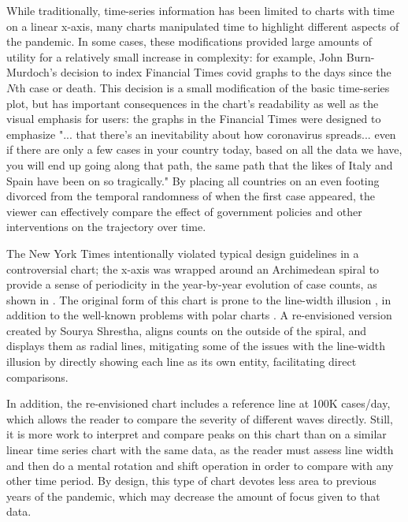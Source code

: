 \documentclass[article]{jdssv}\usepackage[]{graphicx}\usepackage[]{xcolor}
\begin{document}
While traditionally, time-series information has been limited to charts with time on a linear x-axis, many charts manipulated time to highlight different aspects of the pandemic. In some cases, these modifications provided large amounts of utility for a relatively small increase in complexity: for example, John Burn-Murdoch's decision to index Financial Times covid graphs to the days since the $N$th case or death. This decision is a small modification of the basic time-series plot, but has important consequences in the chart's readability as well as the visual emphasis for users: the graphs in the Financial Times were designed to emphasize "... that there's an inevitability about how coronavirus spreads... even if there are only a few cases in your country today, based on all the data we have, you will end up going along that path, the same path that the likes of Italy and Spain have been on so tragically."\citep{hannenCoronavirusTrajectoryTracker2020a} By placing all countries on an even footing divorced from the temporal randomness of when the first case appeared, the viewer can effectively compare the effect of government policies and other interventions on the trajectory over time\citep{burn-murdochAllCountriesDeath2020,burn-murdochLatestCaseTrajectories2020}. 


The New York Times intentionally violated typical design guidelines in a controversial chart; the x-axis was wrapped around an Archimedean spiral to provide a sense of periodicity in the year-by-year evolution of case counts, as shown in . The original form of this chart is prone to the line-width illusion \citep{vanderplasSignsSineIllusion2015}, in addition to the well-known problems with polar charts \citep{hofmannGraphicalTestsPower2012,waldnerComparisonRadialLinear2020}. A re-envisioned version created by Sourya Shrestha, aligns counts on the outside of the spiral, and displays them as radial lines, mitigating some of the issues with the line-width illusion by directly showing each line as its own entity, facilitating direct comparisons. 

In addition, the re-envisioned chart includes a reference line at 100K cases/day, which allows the reader to compare the severity of different waves directly. Still, it is more work to interpret and compare peaks on this chart than on a similar linear time series chart with the same data, as the reader must assess line width and then do a mental rotation and shift operation in order to compare with any other time period. By design, this type of chart devotes less area to previous years of the pandemic, which may decrease the amount of focus given to that data.%
\end{document}
